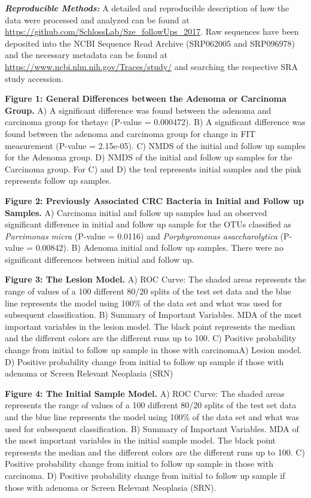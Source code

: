 \documentclass[12pt,]{article}
\begin{document}
\textbf{\emph{Reproducible Methods:}} A detailed and reproducible
description of how the data were processed and analyzed can be found at
\url{https://github.com/SchlossLab/Sze_followUps_2017}. Raw sequences
have been deposited into the NCBI Sequence Read Archive (SRP062005 and
SRP096978) and the necessary metadata can be found at
\url{https://www.ncbi.nlm.nih.gov/Traces/study/} and searching the
respective SRA study accession.

\newpage

\textbf{Figure 1: General Differences between the Adenoma or Carcinoma
Group.} A) A significant difference was found between the adenoma and
carcinoma group for thetayc (P-value = 0.000472). B) A significant
difference was found between the adenoma and carcinoma group for change
in FIT measurement (P-value = 2.15e-05). C) NMDS of the initial and
follow up samples for the Adenoma group. D) NMDS of the initial and
follow up samples for the Carcinoma group. For C) and D) the teal
represents initial samples and the pink represents follow up samples.

\textbf{Figure 2: Previously Associated CRC Bacteria in Initial and
Follow up Samples.} A) Carcinoma initial and follow up samples had an
observed significant difference in initial and follow up sample for the
OTUs classified as \emph{Parvimonas micra} (P-value = 0.0116) and
\emph{Porphyromonas asaccharolytica} (P-value = 0.00842). B) Adenoma
initial and follow up samples. There were no significant differences
between initial and follow up.

\textbf{Figure 3: The Lesion Model.} A) ROC Curve: The shaded areas
represents the range of values of a 100 different 80/20 splits of the
test set data and the blue line represents the model using 100\% of the
data set and what was used for subsequent classification. B) Summary of
Important Variables. MDA of the most important variables in the lesion
model. The black point represents the median and the different colors
are the different runs up to 100. C) Positive probability change from
initial to follow up sample in those with carcinomaA) Lesion model. D)
Positive probability change from initial to follow up sample if those
with adenoma or Screen Relevant Neoplasia (SRN)

\textbf{Figure 4: The Initial Sample Model.} A) ROC Curve: The shaded
areas represents the range of values of a 100 different 80/20 splits of
the test set data and the blue line represents the model using 100\% of
the data set and what was used for subsequent classification. B) Summary
of Important Variables. MDA of the most important variables in the
initial sample model. The black point represents the median and the
different colors are the different runs up to 100. C) Positive
probability change from initial to follow up sample in those with
carcinoma. D) Positive probability change from initial to follow up
sample if those with adenoma or Screen Relevant Neoplasia (SRN).
\end{document}
